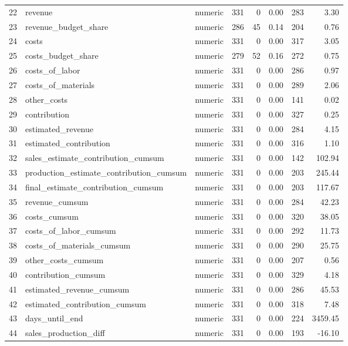 \begin{sidewaystable}[ht]
\begin{tabular}{rllrrrrr}
  22 & revenue & numeric & 331 &   0 & 0.00 & 283 & 3.30 \\ 
  23 & revenue\_budget\_share & numeric & 286 &  45 & 0.14 & 204 & 0.76 \\ 
  24 & costs & numeric & 331 &   0 & 0.00 & 317 & 3.05 \\ 
  25 & costs\_budget\_share & numeric & 279 &  52 & 0.16 & 272 & 0.75 \\ 
  26 & costs\_of\_labor & numeric & 331 &   0 & 0.00 & 286 & 0.97 \\ 
  27 & costs\_of\_materials & numeric & 331 &   0 & 0.00 & 289 & 2.06 \\ 
  28 & other\_costs & numeric & 331 &   0 & 0.00 & 141 & 0.02 \\ 
  29 & contribution & numeric & 331 &   0 & 0.00 & 327 & 0.25 \\ 
  30 & estimated\_revenue & numeric & 331 &   0 & 0.00 & 284 & 4.15 \\ 
  31 & estimated\_contribution & numeric & 331 &   0 & 0.00 & 316 & 1.10 \\ 
  32 & sales\_estimate\_contribution\_cumsum & numeric & 331 &   0 & 0.00 & 142 & 102.94 \\ 
  33 & production\_estimate\_contribution\_cumsum & numeric & 331 &   0 & 0.00 & 203 & 245.44 \\ 
  34 & final\_estimate\_contribution\_cumsum & numeric & 331 &   0 & 0.00 & 203 & 117.67 \\ 
  35 & revenue\_cumsum & numeric & 331 &   0 & 0.00 & 284 & 42.23 \\ 
  36 & costs\_cumsum & numeric & 331 &   0 & 0.00 & 320 & 38.05 \\ 
  37 & costs\_of\_labor\_cumsum & numeric & 331 &   0 & 0.00 & 292 & 11.73 \\ 
  38 & costs\_of\_materials\_cumsum & numeric & 331 &   0 & 0.00 & 290 & 25.75 \\ 
  39 & other\_costs\_cumsum & numeric & 331 &   0 & 0.00 & 207 & 0.56 \\ 
  40 & contribution\_cumsum & numeric & 331 &   0 & 0.00 & 329 & 4.18 \\ 
  41 & estimated\_revenue\_cumsum & numeric & 331 &   0 & 0.00 & 286 & 45.53 \\ 
  42 & estimated\_contribution\_cumsum & numeric & 331 &   0 & 0.00 & 318 & 7.48 \\ 
  43 & days\_until\_end & numeric & 331 &   0 & 0.00 & 224 & 3459.45 \\ 
  44 & sales\_production\_diff & numeric & 331 &   0 & 0.00 & 193 & -16.10 \\ 

\end{tabular}
\end{sidewaystable}
